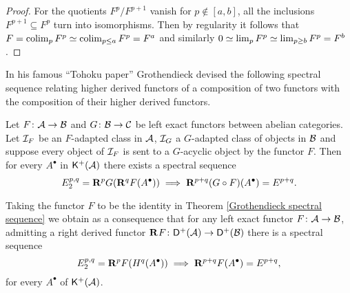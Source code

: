 \begin{proof}
    For the quotients $F^p/F^{p+1}$ vanish for $p \notin [a,b]$, all the inclusions $F^{p+1} \subseteq F^p$ turn into isomorphisms. Then by regularity it follows that $F = \operatorname{colim}_p F^p \simeq \operatorname{colim}_{p \leq a} F^p = F^{a}$ and similarly $0 \simeq \lim_p F^p \simeq \lim_{p \geq b} F^p =  F^b$.
\end{proof}


In his famous ``Tohoku paper'' \cite{} Grothendieck devised the following spectral sequence relating higher derived functors of a composition of two functors with the composition of their higher derived functors.

\begin{theorem}[Grothendieck]
    \label{Grothendieck spectral sequence}
    Let $F\colon \mathcal A \to \mathcal B$ and $G\colon \mathcal B \to \mathcal C$ be left exact functors between abelian categories. Let $\mathcal I_F$ be an $F$-adapted class in $\mathcal A$, $\mathcal I_G$ a $G$-adapted class of objects in $\mathcal B$ and suppose every object of $\mathcal I_F$ is sent to a $G$-acyclic object by the functor $F$. Then for every $A^\bullet$ in $\mathsf{K}^+(\mathcal A)$ there exists a spectral sequence
    \begin{equation}
        \label{eq: Grothendieck spectral sequence}
        E^{p,q}_2 = \mathbf{R}^{p}G(\mathbf{R}^{q}F(A^\bullet)) \implies \mathbf{R}^{p+q}(G \circ F)(A^\bullet) = E^{p+q}.
    \end{equation} 
\end{theorem}

\begin{remark}
    Taking the functor $F$ to be the identity in Theorem \ref{Grothendieck spectral sequence} we obtain as a consequence that for any left exact functor $F \colon \mathcal A \to \mathcal B$, admitting a right derived functor $\mathbf{R}^{}F\colon \mathsf{D}^+(\mathcal A) \to \mathsf{D}^+(\mathcal B)$ there is a spectral sequence 
    \begin{equation}
        \label{eq: special case of Grothendieck spectral sequence}
        E^{p,q}_2 = \mathbf{R}^{p}F(H^q(A^\bullet)) \implies \mathbf{R}^{p+q}F(A^\bullet) = E^{p+q},
    \end{equation}
    for every $A^\bullet$ of $\mathsf{K}^+(\mathcal A)$.
\end{remark}


